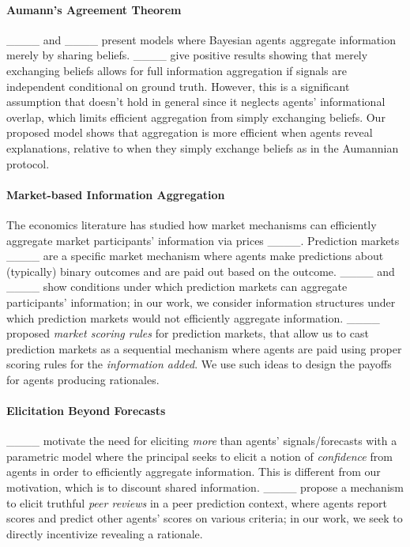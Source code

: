\paragraph{Aumann's Agreement Theorem} ____ and ____ present models where Bayesian agents aggregate information merely by sharing beliefs. ____ give positive results showing that merely exchanging beliefs allows for full information aggregation if signals are independent conditional on ground truth. However, this is a significant assumption that doesn't hold in general since it neglects agents' informational overlap, which limits efficient aggregation from simply exchanging beliefs. Our proposed model shows that aggregation is more efficient when agents reveal explanations, relative to when they simply exchange beliefs as in the Aumannian protocol.

\paragraph{Market-based Information Aggregation} The economics literature has studied how market mechanisms can efficiently aggregate market participants' information via prices ____. Prediction markets ____ are a specific market mechanism where agents make predictions about (typically) binary outcomes and are paid out based on the outcome. ____ and ____ show conditions under which prediction markets can aggregate participants' information; in our work, we consider information structures under which prediction markets would not efficiently aggregate information.  ____ proposed \emph{market scoring rules} for prediction markets, that allow us to cast prediction markets as a sequential mechanism where agents are paid using proper scoring rules for the \emph{information added}. We use such ideas to design the payoffs for agents producing rationales.


\paragraph{Elicitation Beyond Forecasts} ____ motivate the need for eliciting \emph{more} than agents' signals/forecasts with a parametric model where the principal seeks to elicit a notion of \emph{confidence} from agents in order to efficiently aggregate information. This is different from our motivation, which is to discount shared information.  ____ propose a mechanism to elicit truthful \emph{peer reviews} in a peer prediction context, where agents report scores and predict other agents' scores on various criteria; in our work, we seek to directly incentivize revealing a rationale.



